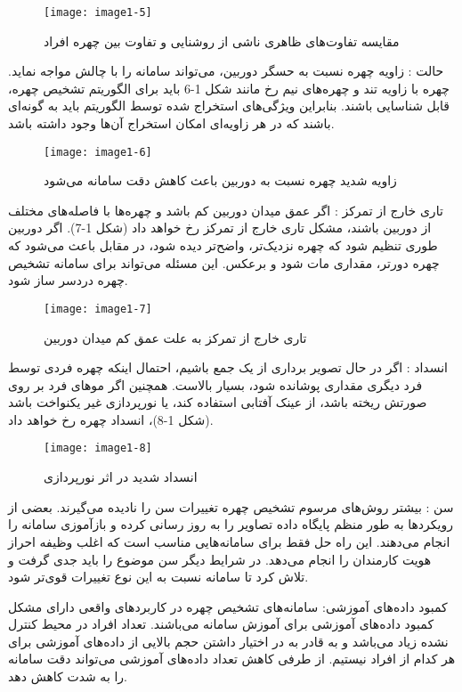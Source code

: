 \begin{figure}[!h]
\centering
\texttt{[image: image1-5]}
\caption{مقایسه تفاوت‌های ظاهری ناشی از روشنایی و تفاوت بین چهره افراد \cite{ref13}}\label{image1-5}
\end{figure}

\noindent
حالت : زاویه چهره نسبت به حسگر دوربین، می‌تواند سامانه را با چالش مواجه نماید. چهره با زاویه تند و چهره‌های نیم رخ مانند شکل 1-6 باید برای الگوریتم تشخیص چهره، قابل شناسایی باشند. بنابراین ویژگی‌های استخراج شده توسط الگوریتم باید به گونه‌ای باشند که در هر زاویه‌ای امکان استخراج آن‌ها وجود داشته باشد.
\begin{figure}[!h]
\centering
\texttt{[image: image1-6]}
\caption{زاویه شدید چهره نسبت به دوربین باعث کاهش دقت سامانه می‌شود \cite{ref13}}\label{image1-6}
\end{figure}

\noindent
تاری خارج از تمرکز : اگر عمق میدان دوربین کم باشد و چهره‌ها با فاصله‌های مختلف از دوربین باشند، مشکل تاری خارج از تمرکز رخ خواهد داد (شکل 1-7). اگر دوربین طوری تنظیم شود که چهره نزدیک‌تر، واضح‌تر دیده شود، در مقابل باعث می‌شود که چهره دورتر، مقداری مات شود و برعکس. این مسئله می‌تواند برای سامانه تشخیص چهره دردسر ساز شود.
\begin{figure}[!h]
\centering
\texttt{[image: image1-7]}
\caption{تاری خارج از تمرکز به علت عمق کم میدان دوربین \cite{ref13}}\label{image1-7}
\end{figure}

\noindent
انسداد : اگر در حال تصویر برداری از یک جمع باشیم، احتمال اینکه چهره فردی توسط فرد دیگری مقداری پوشانده شود، بسیار بالاست. همچنین اگر موهای فرد بر روی صورتش ریخته باشد، از عینک آفتابی استفاده کند، یا نورپردازی غیر یکنواخت باشد (شکل 1-8)، انسداد چهره رخ خواهد داد.
\begin{figure}[!h]
\centering
\texttt{[image: image1-8]}
\caption{انسداد شدید در اثر نورپردازی \cite{ref13}}\label{image1-8}
\end{figure}

\noindent
سن : بیشتر روش‌های مرسوم تشخیص چهره تغییرات سن را نادیده می‌گیرند. بعضی از رویکردها به طور منظم پایگاه داده تصاویر را به روز رسانی کرده و بازآموزی سامانه را انجام می‌دهند. این راه حل فقط برای سامانه‌هایی مناسب است که اغلب وظیفه احراز هویت کارمندان را انجام می‌دهد. در شرایط دیگر سن موضوع را باید جدی گرفت و تلاش کرد تا سامانه نسبت به این نوع تغییرات قوی‌تر شود.

\noindent
کمبود داده‌های آموزشی: سامانه‌های تشخیص چهره در کاربردهای واقعی دارای مشکل کمبود داده‌های آموزشی برای آموزش سامانه می‌باشند. تعداد افراد در محیط کنترل نشده زیاد می‌باشد و به قادر به در اختیار داشتن حجم بالایی از داده‌های آموزشی برای هر کدام از افراد نیستیم. از طرفی کاهش تعداد داده‌های آموزشی می‌تواند دقت سامانه را به شدت کاهش دهد. 

